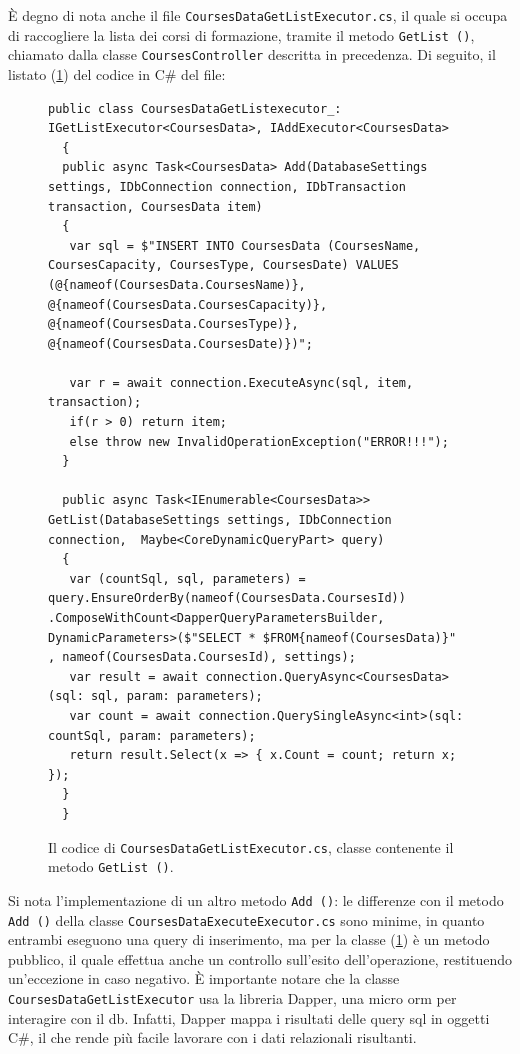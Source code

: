È degno di nota anche il file \texttt{CoursesDataGetListExecutor.cs}, il quale si occupa di raccogliere la lista dei corsi di formazione, tramite il metodo \texttt{GetList ()}, chiamato dalla classe \texttt{CoursesController} descritta in precedenza. Di seguito, il listato (\ref{fig:get list}) del codice in C\# del file:
\begin{figure}[H]
\begin{lstlisting}[linewidth=20cm, basicstyle=\tiny]
  public class CoursesDataGetListexecutor_: IGetListExecutor<CoursesData>, IAddExecutor<CoursesData>
  {
  public async Task<CoursesData> Add(DatabaseSettings settings, IDbConnection connection, IDbTransaction transaction, CoursesData item)
  {
   var sql = $"INSERT INTO CoursesData (CoursesName, CoursesCapacity, CoursesType, CoursesDate) VALUES (@{nameof(CoursesData.CoursesName)}, @{nameof(CoursesData.CoursesCapacity)}, @{nameof(CoursesData.CoursesType)}, @{nameof(CoursesData.CoursesDate)})";

   var r = await connection.ExecuteAsync(sql, item, transaction);
   if(r > 0) return item;
   else throw new InvalidOperationException("ERROR!!!");
  }

  public async Task<IEnumerable<CoursesData>> GetList(DatabaseSettings settings, IDbConnection connection,  Maybe<CoreDynamicQueryPart> query)
  {
   var (countSql, sql, parameters) = query.EnsureOrderBy(nameof(CoursesData.CoursesId)) .ComposeWithCount<DapperQueryParametersBuilder, DynamicParameters>($"SELECT * $FROM{nameof(CoursesData)}"  , nameof(CoursesData.CoursesId), settings);
   var result = await connection.QueryAsync<CoursesData>(sql: sql, param: parameters);
   var count = await connection.QuerySingleAsync<int>(sql:  countSql, param: parameters);
   return result.Select(x => { x.Count = count; return x; });
  }
  }
\end{lstlisting}
\caption{\label{fig:get list}Il codice di \texttt{CoursesDataGetListExecutor.cs}, classe contenente il metodo \texttt{GetList ()}.}
\end{figure}
Si nota l'implementazione di un altro metodo \texttt{Add ()}: le differenze con il metodo \texttt{Add ()} della classe \texttt{CoursesDataExecuteExecutor.cs} sono minime, in quanto entrambi eseguono una query di inserimento, ma per la classe (\ref{fig:get list}) è un metodo pubblico, il quale effettua anche un controllo sull'esito dell'operazione, restituendo un'eccezione in caso negativo.
È importante notare che la classe \texttt{CoursesDataGetListExecutor} usa la libreria Dapper, una micro \acrshort{orm} per interagire con il \acrshort{db}. Infatti, Dapper mappa i risultati delle query \acrshort{sql} in oggetti C\#, il che rende più facile lavorare con i dati relazionali risultanti.\newline

